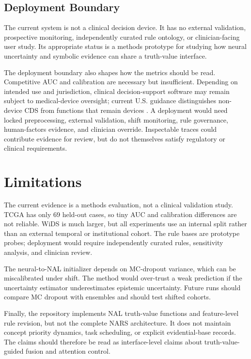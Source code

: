 \documentclass[final]{nesy2026}
\begin{document}
\subsection{Deployment Boundary}

The current system is not a clinical decision device. It has no external validation, prospective monitoring, independently curated rule ontology, or clinician-facing user study. Its appropriate status is a methods prototype for studying how neural uncertainty and symbolic evidence can share a truth-value interface.

The deployment boundary also shapes how the metrics should be read. Competitive AUC and calibration are necessary but insufficient. Depending on intended use and jurisdiction, clinical decision-support software may remain subject to medical-device oversight; current U.S. guidance distinguishes non-device CDS from functions that remain devices \citep{fda2026}. A deployment would need locked preprocessing, external validation, shift monitoring, rule governance, human-factors evidence, and clinician override. Inspectable traces could contribute evidence for review, but do not themselves satisfy regulatory or clinical requirements.

\section{Limitations}
\label{sec:limitations}

The current evidence is a methods evaluation, not a clinical validation study. TCGA has only 69 held-out cases, so tiny AUC and calibration differences are not reliable. WiDS is much larger, but all experiments use an internal split rather than an external temporal or institutional cohort. The rule bases are prototype probes; deployment would require independently curated rules, sensitivity analysis, and clinician review.

The neural-to-NAL initializer depends on MC-dropout variance, which can be miscalibrated under shift. The method would over-trust a weak prediction if the uncertainty estimator underestimates epistemic uncertainty. Future runs should compare MC dropout with ensembles and should test shifted cohorts.

Finally, the repository implements NAL truth-value functions and feature-level rule revision, but not the complete NARS architecture. It does not maintain concept priority dynamics, task scheduling, or explicit evidential-base records. The claims should therefore be read as interface-level claims about truth-value-guided fusion and attention control.
\end{document}
